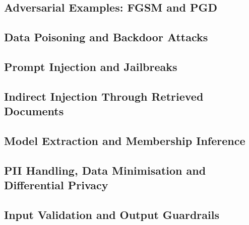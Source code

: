 
\subsection{Adversarial Examples: FGSM and PGD}


\subsection{Data Poisoning and Backdoor Attacks}

\subsection{Prompt Injection and Jailbreaks}

\subsection{Indirect Injection Through Retrieved Documents}


\subsection{Model Extraction and Membership Inference}

\subsection{PII Handling, Data Minimisation and Differential Privacy}

\subsection{Input Validation and Output Guardrails}
